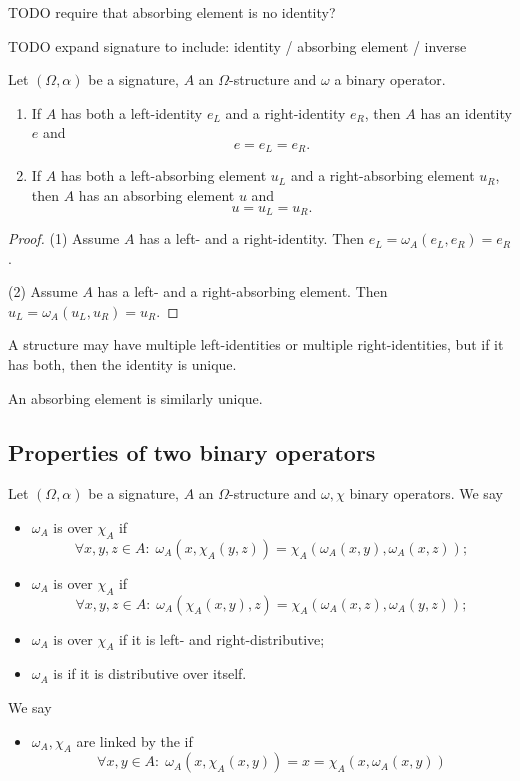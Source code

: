 TODO require that absorbing element is no identity?

TODO expand signature to include: identity / absorbing element / inverse

\begin{lemma} \label{leftRightIdentity}
Let $(\Omega, \alpha)$ be a signature, $A$ an $\Omega$-structure and $\omega$ a binary operator.
\begin{enumerate}
\item If $A$ has both a left-identity $e_L$ and a right-identity $e_R$, then $A$ has an identity $e$ and
\[ e= e_L = e_R. \]
\item If $A$ has both a left-absorbing element $u_L$ and a right-absorbing element $u_R$, then $A$ has an absorbing element $u$ and
\[ u = u_L = u_R. \]
\end{enumerate}
\end{lemma}
\begin{proof}
(1) Assume $A$ has a left- and a right-identity. Then $e_L = \omega_A(e_L, e_R) = e_R$.

(2) Assume $A$ has a left- and a right-absorbing element. Then $u_L = \omega_A(u_L, u_R) = u_R$.
\end{proof}
\begin{corollary}
A structure may have multiple left-identities or multiple right-identities, but if it has both, then the identity is unique.

An absorbing element is similarly unique.
\end{corollary}

\subsection{Properties of two binary operators}
\begin{definition}
Let $(\Omega, \alpha)$ be a signature, $A$ an $\Omega$-structure and $\omega, \chi$ binary operators. We say
\begin{itemize}
\item $\omega_A$ is  over $\chi_A$ if
\[ \forall x,y,z\in A: \; \omega_A(x,\chi_A(y,z)) = \chi_A(\omega_A(x,y),\omega_A(x,z)); \]
\item $\omega_A$ is  over $\chi_A$ if
\[ \forall x,y,z\in A: \; \omega_A(\chi_A(x,y), z) = \chi_A(\omega_A(x,z),\omega_A(y,z)); \]
\item $\omega_A$ is  over $\chi_A$ if it is left- and right-distributive;
\item $\omega_A$ is  if it is distributive over itself.
\end{itemize}
We say
\begin{itemize}
\item $\omega_A, \chi_A$ are linked by the  if
\[ \forall x,y\in A:\; \omega_A(x,\chi_A(x,y)) = x = \chi_A(x,\omega_A(x,y)) \]
\end{itemize}
\end{definition}

